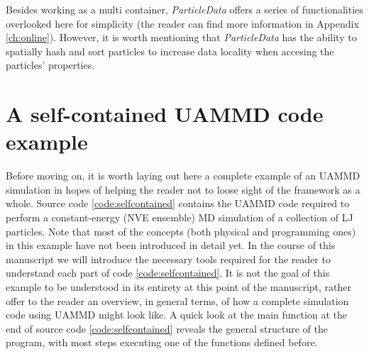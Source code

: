 \documentclass[twoside,openright,titlepage,numbers=noenddot,%
headinclude,footinclude,cleardoublepage=empty,abstract=on,
BCOR=5mm,fontsize=11pt, dvipsnames, paper=b5
]{scrreprt}
\begin{document}
Besides working as a multi container, \emph{ParticleData} offers a series of functionalities overlooked here for simplicity (the reader can find more information in Appendix \ref{ch:online}). However, it is worth mentioning that \emph{ParticleData} has the ability to spatially hash and sort particles to increase data locality when accesing the particles' properties.



\chapter{A self-contained UAMMD code example}

Before moving on, it is worth laying out here a complete example of an UAMMD simulation in hopes of helping the reader not to loose sight of the framework as a whole. Source code \ref{code:selfcontained} contains the UAMMD code required to perform a constant-energy (NVE ensemble) \gls{MD} simulation of a collection of \gls{LJ} particles.
Note that most of the concepts (both physical and programming ones) in this example have not been introduced in detail yet. In the course of this manuscript we will introduce the necessary tools required for the reader to understand each part of code \ref{code:selfcontained}. It is not the goal of this example to be understood in its entirety at this point of the manuscript, rather offer to the reader an overview, in general terms, of how a complete simulation code using UAMMD might look like.
A quick look at the main function at the end of source code \ref{code:selfcontained} reveals the general structure of the program, with most steps executing one of the functions defined before.

\newpage
\end{document}
